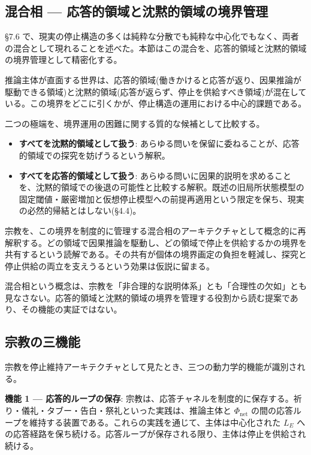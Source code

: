 \subsection{混合相 — 応答的領域と沈黙的領域の境界管理}


\S{}7.6 で、現実の停止構造の多くは純粋な分散でも純粋な中心化でもなく、両者の混合として現れることを述べた。本節はこの混合を、応答的領域と沈黙的領域の境界管理として精密化する。

推論主体が直面する世界は、応答的領域(働きかけると応答が返り、因果推論が駆動できる領域)と沈黙的領域(応答が返らず、停止を供給すべき領域)が混在している。この境界をどこに引くかが、停止構造の運用における中心的課題である。

二つの極端を、境界運用の困難に関する質的な候補として比較する。

\begin{itemize}
\item \textbf{すべてを沈黙的領域として扱う}: あらゆる問いを保留に委ねることが、応答的領域での探究を妨げうるという解釈。
\item \textbf{すべてを応答的領域として扱う}: あらゆる問いに因果的説明を求めることを、沈黙的領域での後退の可能性と比較する解釈。既述の旧局所状態模型の固定閾値・厳密増加と仮想停止模型への前提再適用という限定を保ち、現実の必然的帰結とはしない(\S{}4.4)。
\end{itemize}


宗教を、この境界を制度的に管理する混合相のアーキテクチャとして概念的に再解釈する。どの領域で因果推論を駆動し、どの領域で停止を供給するかの境界を共有するという読解である。その共有が個体の境界画定の負担を軽減し、探究と停止供給の両立を支えうるという効果は仮説に留まる。

混合相という概念は、宗教を「非合理的な説明体系」とも「合理性の欠如」とも見なさない。応答的領域と沈黙的領域の境界を管理する役割から読む提案であり、その機能の実証ではない。

\bigskip


\subsection{宗教の三機能}


宗教を停止維持アーキテクチャとして見たとき、三つの動力学的機能が識別される。

\textbf{機能 1 — 応答的ループの保存}:
宗教は、応答チャネルを制度的に保存する。祈り・儀礼・タブー・告白・祭礼といった実践は、推論主体と $\Phi_{\text{net}}$ の間の応答ループを維持する装置である。これらの実践を通じて、主体は中心化された $L_E$ への応答経路を保ち続ける。応答ループが保存される限り、主体は停止を供給され続ける。

